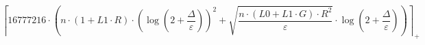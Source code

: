 \[\left\lceil 16777216 \cdot \left(n \cdot \left(1 + L1 \cdot R\right) \cdot \left(\log\left(2 + \frac{\Delta}{\varepsilon}\right)\right)^{2} + \sqrt{\frac{n \cdot \left(L0 + L1 \cdot G\right) \cdot R^{2}}{\varepsilon}} \cdot \log\left(2 + \frac{\Delta}{\varepsilon}\right)\right) \right\rceil_{+}\]
